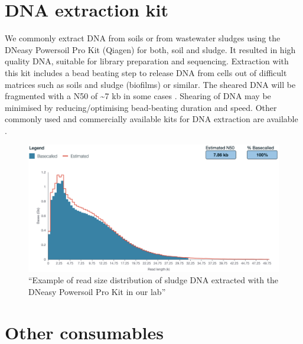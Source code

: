 \documentclass[
]{book}
\begin{document}
\section{DNA extraction kit}\label{dna-extraction-kit}

We commonly extract DNA from soils or from wastewater sludges using the DNeasy Powersoil Pro Kit (Qiagen) for both, soil and sludge. It resulted in high quality DNA, suitable for library preparation and sequencing. Extraction with this kit includes a bead beating step to release DNA from cells out of difficult matrices such as soils and sludge (biofilms) or similar. The sheared DNA will be fragmented with a N50 of \textasciitilde7 kb in some cases \citep{Jensen2024}. Shearing of DNA may be minimised by reducing/optimising bead-beating duration and speed. Other commonly used and commercially available kits for DNA extraction are available \citep{Jensen2024, Gand2023}.

\begin{figure}
\centering
\includegraphics[width=6.25in,height=\textheight]{./img/readsize.png}
\caption{``Example of read size distribution of sludge DNA extracted with the DNeasy Powersoil Pro Kit in our lab''}
\end{figure}

\section{Other consumables}\label{other-consumables}
\end{document}
